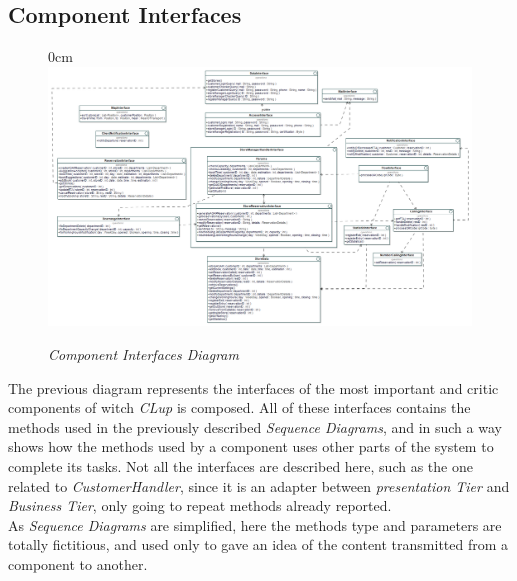 \documentclass{article}
\begin{document}
	\subsection{Component Interfaces}
	\begin{figure}
		\begin{adjustwidth} {0cm}{}
			\centering
			\includegraphics[scale=0.31, angle = 90]{Interface Diagram/class__InterfaceDiagram.png}
		\end{adjustwidth}
		\caption{\emph{Component Interfaces Diagram}}
	\end{figure}
	The previous diagram represents the interfaces of the most important and critic components of witch \emph{CLup} is composed. All of these interfaces contains the methods used in the previously described \emph{Sequence Diagrams}, and in such a way shows how the methods used by a component uses other parts of the system to complete its tasks. Not all the interfaces are described here, such as the one related to \emph{CustomerHandler}, since it is an adapter between \emph{presentation Tier} and \emph{Business Tier}, only going to repeat methods already reported.\\
	As \emph{Sequence Diagrams} are simplified, here the methods type and parameters are totally fictitious, and used only to gave an idea of the content transmitted from a component to another.
\end{document}
